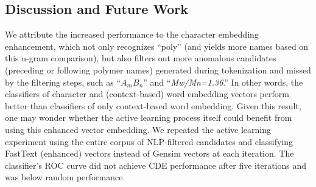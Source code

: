 \subsection{Discussion and Future Work}
\label{sec:discussion}
We attribute the increased performance to the character embedding enhancement, which not only recognizes ``poly'' (and yields more names based on this n-gram comparison), but also filters out more anomalous candidates (preceding or following polymer names) generated during tokenization and missed by the filtering steps, such as ``\textit{$A_mB_n$}'' and ``\textit{Mw/Mn=1.36}.'' 
In other words, the classifiers of character and (context-based) word embedding vectors perform better than classifiers of only context-based word embedding.
Given this result, one may wonder whether the active learning process itself could benefit from using this enhanced vector embedding. 
We repeated the active learning experiment using the entire corpus of NLP-filtered candidates and classifying FastText (enhanced) vectors instead of Gensim vectors at each iteration. 
The classifier's ROC curve did not achieve CDE performance after five iterations and was below random performance.%

